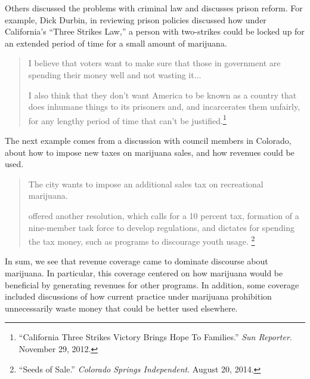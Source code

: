 Others discussed the problems with criminal law and discusses prison reform. For example, Dick Durbin, in reviewing prison policies discussed how under California's ``Three Strikes Law,'' a person with two-strikes could be locked up for an extended period of time for a small amount of marijuana.



\begin{quotation}
\begin{singlespace}
\noindent I believe that voters want to make sure that those in government are spending their money well and not wasting it... \newline

\noindent I also think that they don't want America to be known as a country that does inhumane things to its prisoners and, and incarcerates them unfairly, for any lengthy period of time that can't be justified.\footnote{``California Three Strikes Victory Brings Hope To Families.'' \textit{Sun Reporter}. November 29, 2012.}
\end{singlespace}
\end{quotation}



The next example comes from a discussion with council members in Colorado, about how to impose new taxes on marijuana sales, and how revenues could be used.

\begin{quotation}
\begin{singlespace}
\noindent The city wants to impose an additional sales tax on recreational marijuana. 

 offered another resolution, which calls for a 10 percent tax, formation of a nine-member task force to develop regulations, and dictates for spending the tax money, such as programs to discourage youth usage. \footnote{``Seeds of Sale.'' \textit{Colorado Springs Independent}. August 20, 2014.}
\end{singlespace}
\end{quotation}


In sum, we see that revenue coverage came to dominate discourse about marijuana. In particular, this coverage centered on how marijuana would be beneficial by generating revenues for other programs. In addition, some coverage included discussions of how current practice under marijuana prohibition unnecessarily waste money that could be better used elsewhere. 





